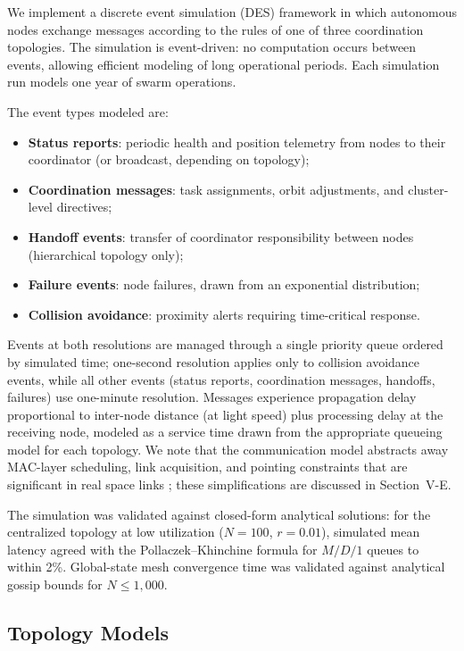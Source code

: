 \documentclass[journal]{IEEEtran}
\begin{document}
We implement a discrete event simulation (DES) framework in which autonomous nodes exchange messages according to the rules of one of three coordination topologies. The simulation is event-driven: no computation occurs between events, allowing efficient modeling of long operational periods. Each simulation run models one year of swarm operations.

The event types modeled are:
\begin{itemize}
    \item \textbf{Status reports}: periodic health and position telemetry from nodes to their coordinator (or broadcast, depending on topology);
    \item \textbf{Coordination messages}: task assignments, orbit adjustments, and cluster-level directives;
    \item \textbf{Handoff events}: transfer of coordinator responsibility between nodes (hierarchical topology only);
    \item \textbf{Failure events}: node failures, drawn from an exponential distribution;
    \item \textbf{Collision avoidance}: proximity alerts requiring time-critical response.
\end{itemize}

Events at both resolutions are managed through a single priority queue ordered by simulated time; one-second resolution applies only to collision avoidance events, while all other events (status reports, coordination messages, handoffs, failures) use one-minute resolution. Messages experience propagation delay proportional to inter-node distance (at light speed) plus processing delay at the receiving node, modeled as a service time drawn from the appropriate queueing model for each topology. We note that the communication model abstracts away MAC-layer scheduling, link acquisition, and pointing constraints that are significant in real space links \cite{ccsds_prox1}; these simplifications are discussed in Section~V-E.

The simulation was validated against closed-form analytical solutions: for the centralized topology at low utilization ($N = 100$, $r = 0.01$), simulated mean latency agreed with the Pollaczek--Khinchine formula for $M/D/1$ queues to within 2\%. Global-state mesh convergence time was validated against analytical gossip bounds \cite{demers_gossip} for $N \leq 1{,}000$.

\subsection{Topology Models}
\end{document}
